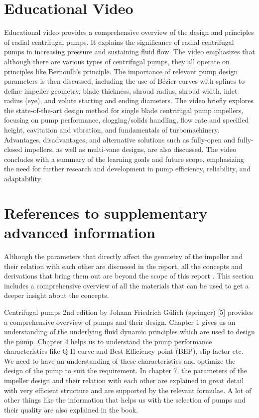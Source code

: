\documentclass[11pt,a4paper]{scrartcl}
\begin{document}
\section{Educational Video}
Educational video provides a comprehensive overview of the design and principles of radial centrifugal pumps. It explains the significance of radial centrifugal pumps in increasing pressure and sustaining fluid flow. The video emphasizes that although there are various types of centrifugal pumps, they all operate on principles like Bernoulli's principle. The importance of relevant pump design parameters is then discussed, including the use of Bézier curves with splines to define impeller geometry, blade thickness, shroud radius, shroud width, inlet radius (eye), and volute starting and ending diameters. The video briefly explores the state-of-the-art design method for single blade centrifugal pump impellers, focusing on pump performance, clogging/solids handling, flow rate and specified height, cavitation and vibration, and fundamentals of turbomachinery. Advantages, disadvantages, and alternative solutions such as fully-open and fully-closed impellers, as well as multi-vane designs, are also discussed. The video concludes with a summary of the learning goals and future scope, emphasizing the need for further research and development in pump efficiency, reliability, and adaptability.
\section{ References to supplementary advanced information}
Although the parameters that directly affect the geometry of the impeller and their relation with each other are discussed in the report, all the concepts and derivations that bring them out are beyond the scope of this report . This section includes a comprehensive overview of all the materials that can be used to get a deeper insight about the concepts. 

Centrifugal pumps 2nd edition by Johann Friedrich Gülich (springer) [5]  provides a comprehensive overview of pumps and their design. Chapter 1 gives us an understanding of the underlying fluid dynamic principles which are used to design the pump. Chapter 4 helps us to understand the pump performance characteristics like Q-H curve and Best Efficiency point (BEP), slip factor etc. We need to have an understanding of these characteristics and optimize the design of the pump to suit the requirement. In chapter 7, the parameters of the impeller design and their relation with each other are explained in great detail with very efficient structure and are supported by the relevant formulae. A lot of other things like the information that helps us with the selection of pumps and their quality are also explained in the book. 
\end{document}
